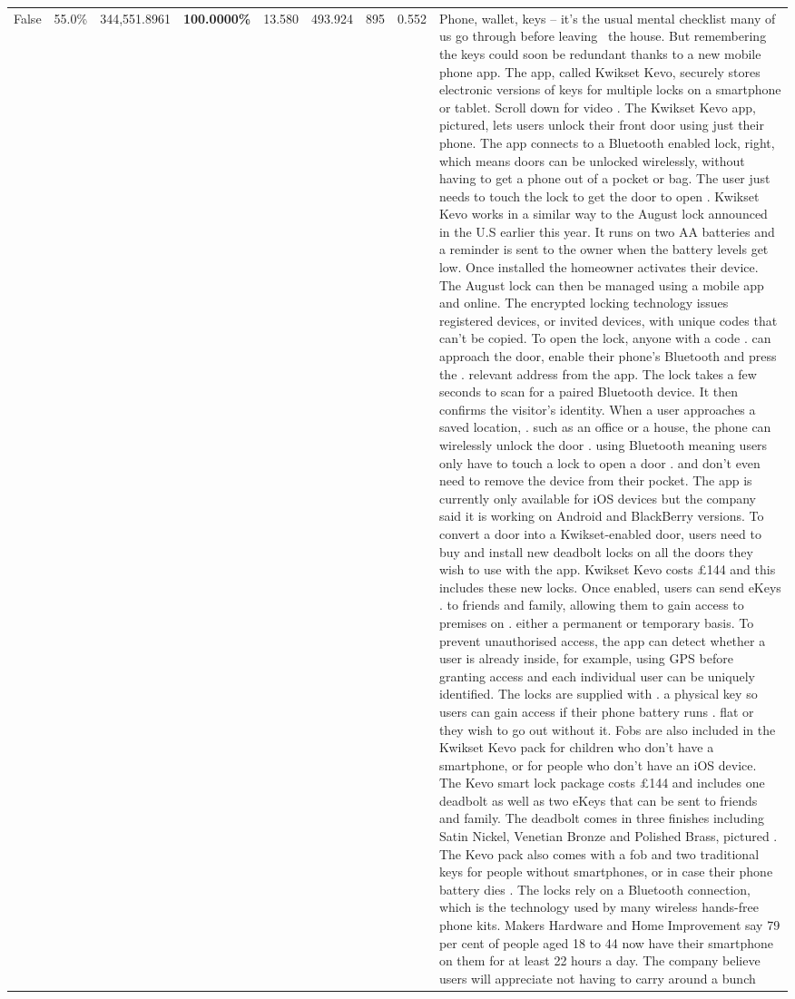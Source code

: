 \begin{table}[H]
\begin{tabular}{lllrlllll}
False & 55.0\% & 344,551.8961 & \bfseries \color{red} 100.0000\% & 13.580 & 493.924 & 895 & 0.552 & Phone, wallet, keys – it’s the usual mental checklist many of us go through before leaving  the house. But remembering the keys could soon be redundant thanks to a new mobile phone app. The app, called Kwikset Kevo, securely stores electronic versions of keys for multiple locks on a smartphone or tablet. Scroll down for video . The Kwikset Kevo app, pictured, lets users unlock their front door using just their phone. The app connects to a Bluetooth enabled lock, right, which means doors can be unlocked wirelessly, without having to get a phone out of a pocket or bag. The user just needs to touch the lock to get the door to open . Kwikset Kevo works in a similar way to the August lock announced in the U.S earlier this year. It runs on two AA batteries and a reminder is sent to the owner when the battery levels get low. Once installed the homeowner activates their device. The August lock can then be managed using a mobile app and online. The encrypted locking technology issues registered devices, or invited devices, with unique codes that can't be copied. To open the lock, anyone with a code . can approach the door, enable their phone's Bluetooth and press the . relevant address from the app. The lock takes a few seconds to scan for a paired Bluetooth device. It then confirms the visitor's identity. When a user approaches a saved location, . such as an office or a house, the phone can wirelessly unlock the door . using Bluetooth meaning users only have to touch a lock to open a door . and don't even need to remove the device from their pocket. The app is currently only available for iOS devices but the company said it is working on Android and BlackBerry versions. To convert a door into a Kwikset-enabled door, users need to buy and install new deadbolt locks on all the doors they wish to use with the app. Kwikset Kevo costs £144 and this includes these new locks. Once enabled, users can send eKeys . to friends and family, allowing them to gain access to premises on . either a permanent or temporary basis. To prevent unauthorised access, the app can detect whether a user is already inside, for example, using GPS before granting access and each individual user can be uniquely identified. The locks are supplied with . a physical key so users can gain access if their phone battery runs . flat or they wish to go out without it. Fobs are also included in the Kwikset Kevo pack for children who don't have a smartphone, or for people who don't have an iOS device. The Kevo smart lock package costs £144 and includes one deadbolt as well as two eKeys that can be sent to friends and family. The deadbolt comes in three finishes including Satin Nickel, Venetian Bronze and Polished Brass, pictured . The Kevo pack also comes with a fob and two traditional keys for people without smartphones, or in case their phone battery dies . The locks rely on a Bluetooth connection, which is the technology used by many wireless hands-free phone kits. Makers Hardware and Home Improvement say 79 per cent of people aged 18 to 44 now have their smartphone on them for at least 22 hours a day. The company believe users will appreciate not having to carry around a bunch 
\end{tabular}
\end{table}
